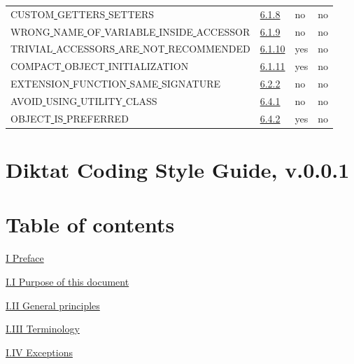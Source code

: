 \begin{longtable}{ |l|p{0.8cm}|p{0.8cm}| p{3cm} | }
CUSTOM\underline{ }GETTERS\underline{ }SETTERS & \hyperref[sec:6.1.8]{6.1.8} &  no  &   no  \\
WRONG\underline{ }NAME\underline{ }OF\underline{ }VARIABLE\underline{ }INSIDE\underline{ }ACCESSOR & \hyperref[sec:6.1.9]{6.1.9} &  no  &   no \\
TRIVIAL\underline{ }ACCESSORS\underline{ }ARE\underline{ }NOT\underline{ }RECOMMENDED & \hyperref[sec:6.1.10]{6.1.10} &  yes  &   no  \\
COMPACT\underline{ }OBJECT\underline{ }INITIALIZATION & \hyperref[sec:6.1.11]{6.1.11} &  yes  &   no  \\
EXTENSION\underline{ }FUNCTION\underline{ }SAME\underline{ }SIGNATURE & \hyperref[sec:6.2.2]{6.2.2} &  no  &   no  \\
AVOID\underline{ }USING\underline{ }UTILITY\underline{ }CLASS & \hyperref[sec:6.4.1]{6.4.1} &  no  &  no \\
OBJECT\underline{ }IS\underline{ }PREFERRED & \hyperref[sec:6.4.2]{6.4.2} &  yes  &  no \\
\hline
\end{longtable}

\hspace{0.0cm}\hyperref[sec:]{}

\section*{Diktat Coding Style Guide, v.0.0.1}

\hspace{0.0cm}\hyperref[sec:]{}

\section*{Table of contents}

\hspace{0.0cm}\hyperref[sec:]{I Preface}

\hspace{0.5cm}\hyperref[sec:]{ I.I Purpose of this document}

\hspace{0.5cm}\hyperref[sec:]{ I.II General principles}

\hspace{0.5cm}\hyperref[sec:]{ I.III Terminology}

\hspace{0.5cm}\hyperref[sec:]{ I.IV Exceptions}

\hspace{0.0cm}\hyperref[sec:]{}

